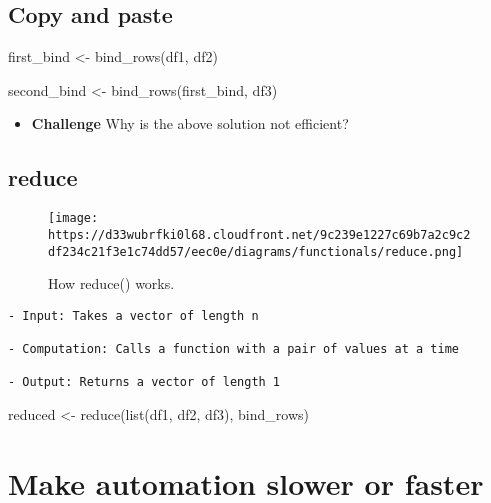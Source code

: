 \documentclass[
]{book}
\newenvironment{Shaded}{\begin{snugshade}}{\end{snugshade}}
\newcommand{\FunctionTok}[1]{\textcolor[rgb]{0.00,0.00,0.00}{#1}}
\newcommand{\NormalTok}[1]{#1}
\newcommand{\OtherTok}[1]{\textcolor[rgb]{0.56,0.35,0.01}{#1}}
\providecommand{\tightlist}{%
  \setlength{\itemsep}{0pt}\setlength{\parskip}{0pt}}
\begin{document}
\hypertarget{copy-and-paste}{%
\subsection{Copy and paste}\label{copy-and-paste}}

\begin{Shaded}
\begin{Highlighting}[]
\NormalTok{first\_bind }\OtherTok{\textless{}{-}} \FunctionTok{bind\_rows}\NormalTok{(df1, df2)}

\NormalTok{second\_bind }\OtherTok{\textless{}{-}} \FunctionTok{bind\_rows}\NormalTok{(first\_bind, df3)}
\end{Highlighting}
\end{Shaded}

\begin{itemize}
\tightlist
\item
  \textbf{Challenge}
  Why is the above solution not efficient?
\end{itemize}

\hypertarget{reduce-1}{%
\subsection{reduce}\label{reduce-1}}

\begin{figure}
\centering
\texttt{[image: https://d33wubrfki0l68.cloudfront.net/9c239e1227c69b7a2c9c2df234c21f3e1c74dd57/eec0e/diagrams/functionals/reduce.png]}
\caption{How reduce() works.}
\end{figure}

\begin{verbatim}
- Input: Takes a vector of length n

- Computation: Calls a function with a pair of values at a time

- Output: Returns a vector of length 1
\end{verbatim}

\begin{Shaded}
\begin{Highlighting}[]
\NormalTok{reduced }\OtherTok{\textless{}{-}} \FunctionTok{reduce}\NormalTok{(}\FunctionTok{list}\NormalTok{(df1, df2, df3), bind\_rows)}
\end{Highlighting}
\end{Shaded}

\hypertarget{speed}{%
\section{Make automation slower or faster}\label{speed}}
\end{document}
